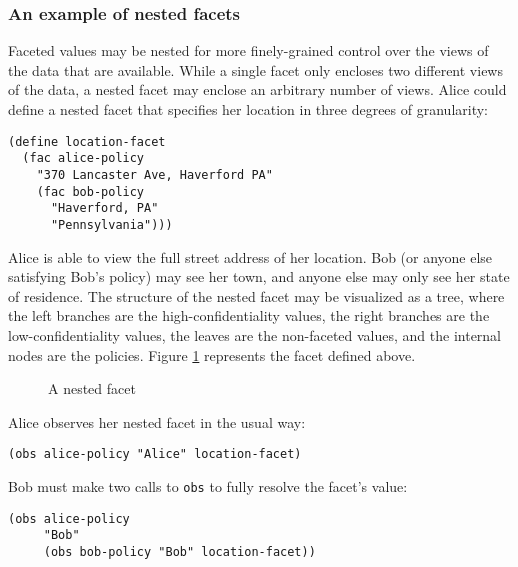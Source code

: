 \documentclass{article}
\begin{document}
\subsubsection{An example of nested facets}
Faceted values may be nested for more finely-grained control over the views of the data that are available. While a single facet only encloses two different views of the data, a nested facet may enclose an arbitrary number of views. Alice could define a nested facet that specifies her location in three degrees of granularity:

\begin{lstlisting}
(define location-facet
  (fac alice-policy
    "370 Lancaster Ave, Haverford PA"
    (fac bob-policy
      "Haverford, PA"
      "Pennsylvania")))
\end{lstlisting}

Alice is able to view the full street address of her location. Bob (or anyone else satisfying Bob's policy) may see her town, and anyone else may only see her state of residence. The structure of the nested facet may be visualized as a tree, where the left branches are the high-confidentiality values, the right branches are the low-confidentiality values, the leaves are the non-faceted values, and the internal nodes are the policies. Figure \ref{figure:nested} represents the facet defined above.

\begin{figure}[h]
\begin{center}
	\caption{A nested facet}
	\label{figure:nested}
\end{center}
\end{figure}

Alice observes her nested facet in the usual way:

\begin{lstlisting}
(obs alice-policy "Alice" location-facet)
\end{lstlisting}

Bob must make two calls to \texttt{obs} to fully resolve the facet's value:

\begin{lstlisting}
(obs alice-policy
     "Bob"
     (obs bob-policy "Bob" location-facet))
\end{lstlisting}
\end{document}
